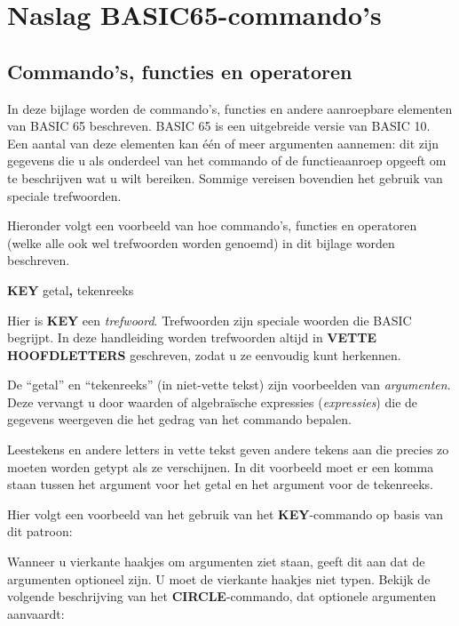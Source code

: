 \hypersetup{bookmarksdepth=2}
\chapter{Naslag BASIC65-commando's}
\label{cha:basic-reference}


\section{Commando's, functies en operatoren}

In deze bijlage worden de commando's, functies en andere aanroepbare elementen van BASIC 65 beschreven. BASIC 65 is een uitgebreide versie van BASIC 10. Een aantal van deze elementen kan één of meer argumenten aannemen: dit zijn gegevens die u als onderdeel van het commando of de functieaanroep opgeeft om te beschrijven wat u wilt bereiken. Sommige vereisen bovendien het gebruik van speciale trefwoorden.

Hieronder volgt een voorbeeld van hoe commando's, functies en operatoren (welke alle ook wel trefwoorden worden genoemd) in dit bijlage worden beschreven.

{\bf KEY} getal{\bf,} tekenreeks

Hier is {\bf KEY} een {\em trefwoord}. Trefwoorden zijn speciale woorden die BASIC begrijpt. In deze handleiding worden trefwoorden altijd in {\bf VETTE HOOFDLETTERS} geschreven, zodat u ze eenvoudig kunt herkennen.

De ``getal'' en ``tekenreeks'' (in niet-vette tekst) zijn voorbeelden van {\em argumenten}. Deze vervangt u door waarden of algebraïsche expressies ({\em expressies}) die de gegevens weergeven die het gedrag van het commando bepalen.

Leestekens en andere letters in vette tekst geven andere tekens aan die precies zo moeten worden getypt als ze verschijnen. In dit voorbeeld moet er een komma staan tussen het argument voor het getal en het argument voor de tekenreeks.

Hier volgt een voorbeeld van het gebruik van het {\bf KEY}-commando op basis van dit patroon:


Wanneer u vierkante haakjes om argumenten ziet staan, geeft dit aan dat de argumenten optioneel zijn. U moet de vierkante haakjes niet typen. Bekijk de volgende beschrijving van het {\bf CIRCLE}-commando, dat optionele argumenten aanvaardt:

